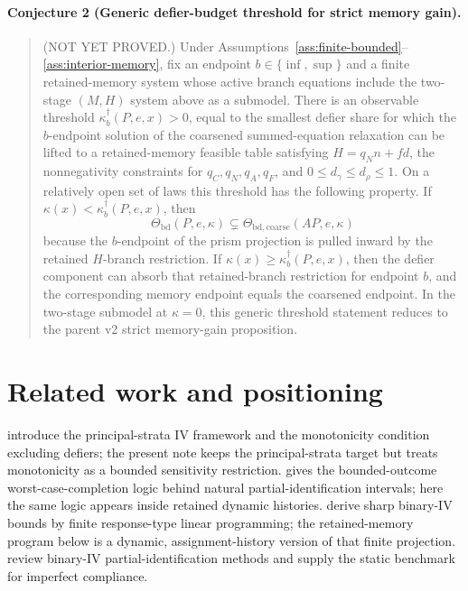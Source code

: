 \documentclass[11pt]{article}
\theoremstyle{definition}
\theoremstyle{plain}
\theoremstyle{remark}
\begin{document}
\paragraph{Conjecture 2 (Generic defier-budget threshold for strict memory gain).}\label{conj:intro-phase-transition}
\begin{quote}
(NOT YET PROVED.)  Under Assumptions~\ref{ass:finite-bounded}--\ref{ass:interior-memory}, fix an endpoint \(b\in\{\inf,\sup\}\) and a finite retained-memory system whose active branch equations include the two-stage \((M,H)\) system above as a submodel.  There is an observable threshold \(\kappa^\dagger_b(P,e,x)>0\), equal to the smallest defier share for which the \(b\)-endpoint solution of the coarsened summed-equation relaxation can be lifted to a retained-memory feasible table satisfying \(H=q_Nn+fd\), the nonnegativity constraints for \(q_C,q_N,q_A,q_F\), and \(0\le d_\gamma\le d_\rho\le1\).  On a relatively open set of laws this threshold has the following property.  If \(\kappa(x)<\kappa^\dagger_b(P,e,x)\), then
\[
\Theta_{\mathrm{bd}}(P,e,\kappa)\subsetneq
\Theta_{\mathrm{bd,coarse}}(A P,e,\kappa)
\]
because the \(b\)-endpoint of the prism projection is pulled inward by the retained \(H\)-branch restriction.  If \(\kappa(x)\ge\kappa^\dagger_b(P,e,x)\), then the defier component can absorb that retained-branch restriction for endpoint \(b\), and the corresponding memory endpoint equals the coarsened endpoint.  In the two-stage submodel at \(\kappa=0\), this generic threshold statement reduces to the parent v2 strict memory-gain proposition.
\end{quote}

\section{Related work and positioning}
\cite{AngristImbensRubin1996} introduce the principal-strata IV framework and the monotonicity condition excluding defiers; the present note keeps the principal-strata target but treats monotonicity as a bounded sensitivity restriction.
\cite{Manski1990} gives the bounded-outcome worst-case-completion logic behind natural partial-identification intervals; here the same logic appears inside retained dynamic histories.
\cite{BalkePearl1997} derive sharp binary-IV bounds by finite response-type linear programming; the retained-memory program below is a dynamic, assignment-history version of that finite projection.
\cite{SwansonHernanMillerRobinsRichardson2018} review binary-IV partial-identification methods and supply the static benchmark for imperfect compliance.
\end{document}

